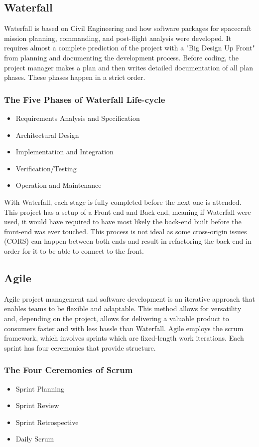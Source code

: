 \subsection{Waterfall}
Waterfall is based on Civil Engineering and how software packages for spacecraft mission planning, commanding, and post-flight analysis were developed. \cite{ref2} It requires almost a complete prediction of the project with a "Big Design Up Front" from planning and documenting the development process. Before coding, the project manager makes a plan and then writes detailed documentation of all plan phases. These phases happen in a strict order.

\subsubsection{The Five Phases of Waterfall Life-cycle}
\begin{itemize}
    \item Requirements Analysis and Specification
    \item Architectural Design
    \item Implementation and Integration
    \item Verification/Testing
    \item Operation and Maintenance
\end{itemize}\cite{ref3}

With Waterfall, each stage is fully completed before the next one is attended. This project has a setup of a Front-end and Back-end, meaning if Waterfall were used, it would have required to have most likely the back-end built before the front-end was ever touched. This process is not ideal as some cross-origin issues (CORS) can happen between both ends and result in refactoring the back-end in order for it to be able to connect to the front.

\subsection{Agile}
Agile project management and software development is an iterative approach that enables teams to be flexible and adaptable. This method allows for versatility and, depending on the project, allows for delivering a valuable product to consumers faster and with less hassle than Waterfall. Agile employs the scrum framework, which involves sprints which are fixed-length work iterations. Each sprint has four ceremonies that provide structure.

\subsubsection{The Four Ceremonies of Scrum}
\begin{itemize}
    \item Sprint Planning
    \item Sprint Review
    \item Sprint Retrospective
    \item Daily Scrum
\end{itemize}\cite{ref3}

